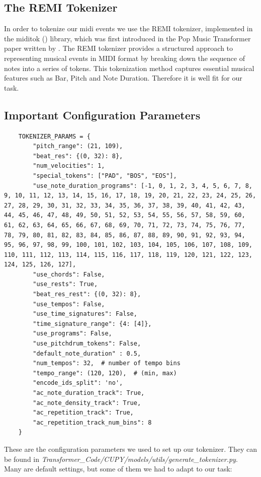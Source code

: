 \documentclass[a4paper,12pt]{extarticle}
\begin{document}
\subsection{The REMI Tokenizer}
In order to tokenize our midi events we use the REMI tokenizer, implemented in the miditok (\cite{miditok2021}) library, which was first introduced in the Pop Music Transformer paper written by \cite{huang_remi_2020}. The REMI tokenizer provides a structured approach to representing musical events in MIDI format by breaking down the sequence of notes into a series of tokens. This tokenization method captures essential musical features such as Bar, Pitch and Note Duration. Therefore it is well fit for our task.

\subsection{Important Configuration Parameters}
\begin{lstlisting}
    TOKENIZER_PARAMS = {
        "pitch_range": (21, 109),
        "beat_res": {(0, 32): 8},
        "num_velocities": 1,
        "special_tokens": ["PAD", "BOS", "EOS"],
        "use_note_duration_programs": [-1, 0, 1, 2, 3, 4, 5, 6, 7, 8, 9, 10, 11, 12, 13, 14, 15, 16, 17, 18, 19, 20, 21, 22, 23, 24, 25, 26, 27, 28, 29, 30, 31, 32, 33, 34, 35, 36, 37, 38, 39, 40, 41, 42, 43, 44, 45, 46, 47, 48, 49, 50, 51, 52, 53, 54, 55, 56, 57, 58, 59, 60, 61, 62, 63, 64, 65, 66, 67, 68, 69, 70, 71, 72, 73, 74, 75, 76, 77, 78, 79, 80, 81, 82, 83, 84, 85, 86, 87, 88, 89, 90, 91, 92, 93, 94, 95, 96, 97, 98, 99, 100, 101, 102, 103, 104, 105, 106, 107, 108, 109, 110, 111, 112, 113, 114, 115, 116, 117, 118, 119, 120, 121, 122, 123, 124, 125, 126, 127],
        "use_chords": False,
        "use_rests": True,
        "beat_res_rest": {(0, 32): 8},
        "use_tempos": False,
        "use_time_signatures": False,
        "time_signature_range": {4: [4]},
        "use_programs": False,
        "use_pitchdrum_tokens": False,
        "default_note_duration" : 0.5, 
        "num_tempos": 32,  # number of tempo bins
        "tempo_range": (120, 120),  # (min, max)
        "encode_ids_split": 'no',
        "ac_note_duration_track": True,
        "ac_note_density_track": True,
        "ac_repetition_track": True,
        "ac_repetition_track_num_bins": 8
    }
\end{lstlisting}
These are the configuration parameters we used to set up our tokenizer. They can be found in \textit{Transformer\_Code/CUPY/models/utils/generate\_tokenizer.py}. Many are default settings, but some of them we had to adapt to our task:\newline
\end{document}
